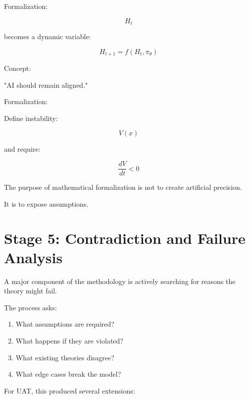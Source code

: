 \documentclass[11pt]{article}
\begin{document}
Formalization:


\[
H_t
\]


becomes a dynamic variable:


\[
H_{t+1}=f(H_t,\pi_\theta)
\]



Concept:

"AI should remain aligned."


Formalization:


Define instability:


\[
V(x)
\]


and require:


\[
\frac{dV}{dt}<0
\]



The purpose of mathematical formalization is not to create artificial
precision.


It is to expose assumptions.



\section{Stage 5: Contradiction and Failure Analysis}


A major component of the methodology is actively searching for reasons
the theory might fail.


The process asks:


\begin{enumerate}

\item What assumptions are required?

\item What happens if they are violated?

\item What existing theories disagree?

\item What edge cases break the model?

\end{enumerate}



For UAT, this produced several extensions:
\end{document}
